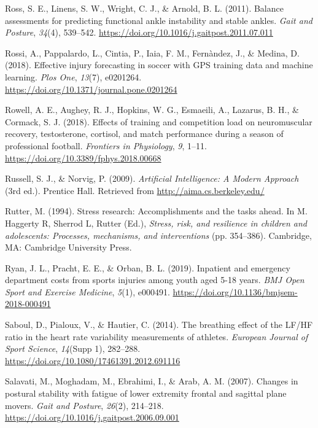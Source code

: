 \documentclass[
  english,
  man,floatsintext]{apa6}
\begin{document}
\leavevmode\hypertarget{ref-Ross2011}{}%
Ross, S. E., Linens, S. W., Wright, C. J., \& Arnold, B. L. (2011). Balance assessments for predicting functional ankle instability and stable ankles. \emph{Gait and Posture}, \emph{34}(4), 539--542. \url{https://doi.org/10.1016/j.gaitpost.2011.07.011}

\leavevmode\hypertarget{ref-Rossi2018}{}%
Rossi, A., Pappalardo, L., Cintia, P., Iaia, F. M., Fernàndez, J., \& Medina, D. (2018). Effective injury forecasting in soccer with GPS training data and machine learning. \emph{Plos One}, \emph{13}(7), e0201264. \url{https://doi.org/10.1371/journal.pone.0201264}

\leavevmode\hypertarget{ref-Rowell2018}{}%
Rowell, A. E., Aughey, R. J., Hopkins, W. G., Esmaeili, A., Lazarus, B. H., \& Cormack, S. J. (2018). Effects of training and competition load on neuromuscular recovery, testosterone, cortisol, and match performance during a season of professional football. \emph{Frontiers in Physiology}, \emph{9}, 1--11. \url{https://doi.org/10.3389/fphys.2018.00668}

\leavevmode\hypertarget{ref-Norvig2009}{}%
Russell, S. J., \& Norvig, P. (2009). \emph{Artificial Intelligence: A Modern Approach} (3rd ed.). Prentice Hall. Retrieved from \url{http://aima.cs.berkeley.edu/}

\leavevmode\hypertarget{ref-Rutter1994}{}%
Rutter, M. (1994). Stress research: Accomplishments and the tasks ahead. In M. Haggerty R, Sherrod L, Rutter (Ed.), \emph{Stress, risk, and resilience in children and adolescents: Processes, mechanisms, and interventions} (pp. 354--386). Cambridge, MA: Cambridge University Press.

\leavevmode\hypertarget{ref-Ryan2019}{}%
Ryan, J. L., Pracht, E. E., \& Orban, B. L. (2019). Inpatient and emergency department costs from sports injuries among youth aged 5-18 years. \emph{BMJ Open Sport and Exercise Medicine}, \emph{5}(1), e000491. \url{https://doi.org/10.1136/bmjsem-2018-000491}

\leavevmode\hypertarget{ref-Saboul2014}{}%
Saboul, D., Pialoux, V., \& Hautier, C. (2014). The breathing effect of the LF/HF ratio in the heart rate variability measurements of athletes. \emph{European Journal of Sport Science}, \emph{14}(Supp 1), 282--288. \url{https://doi.org/10.1080/17461391.2012.691116}

\leavevmode\hypertarget{ref-Salavati2007}{}%
Salavati, M., Moghadam, M., Ebrahimi, I., \& Arab, A. M. (2007). Changes in postural stability with fatigue of lower extremity frontal and sagittal plane movers. \emph{Gait and Posture}, \emph{26}(2), 214--218. \url{https://doi.org/10.1016/j.gaitpost.2006.09.001}
\end{document}
